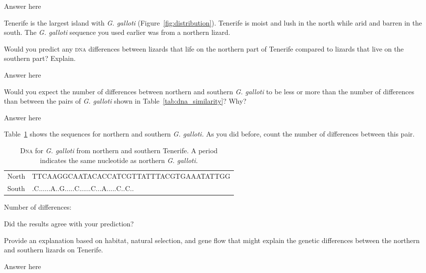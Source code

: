 \documentclass[12pt, hidelinks]{exam}
\newcommand*\AnswerBox[2]{%
    \parbox[t][#1]{0.92\textwidth}{%
    \begin{solution}#2\end{solution}}
    \vspace{\stretch{1}}
}
\begin{document}
\begin{questions}
\AnswerBox{4\baselineskip}{Answer here}

\newpage

Tenerife is the largest island with \textit{G. galloti} (Figure~\ref{fig:distribution}). Tenerife is moist and lush in the north while arid and barren in the south. The \textit{G. galloti} sequence you used earlier was from a northern lizard. 

\question
Would you predict any \textsc{dna} differences between lizards that life on the northern part of Tenerife compared to lizards that live on the southern part? Explain.

\AnswerBox{2\baselineskip}{Answer here}

\question
Would you expect the number of differences between northern and southern \textit{G. galloti} to be less or more than the number of differences than between the pairs of \textit{G. galloti} shown in Table~\ref{tab:dna_similarity}? Why?

\AnswerBox{2\baselineskip}{Answer here}

\question
Table~\ref{tab:galloti} shows the sequences for northern and southern \textit{G. galloti.} As you did before, count the number of differences between this pair.

{\dnatable
\begin{longtable}[l]{ll}
\caption{D\textsc{na} for \textit{G. galloti} from northern and southern Tenerife. A period \\indicates the same nucleotide as northern \textit{G. galloti.}\label{tab:galloti}}\tabularnewline
\toprule
{\regfont North} & TTCAAGGCAATACACCATCGTTATTTACGTGAAATATTGG \tabularnewline
{\regfont South} & .C......A..G.....C......C...A.....C..C.. \tabularnewline
\bottomrule
\end{longtable}
}

Number of differences:

\vspace{\baselineskip}

\question
Did the results agree with your prediction? 

\vspace{2\baselineskip}

\question
Provide an explanation based on habitat, natural selection, and gene flow that might explain the genetic differences between the northern and southern lizards on Tenerife.

\AnswerBox{3\baselineskip}{Answer here}


\end{questions}
\end{document}
